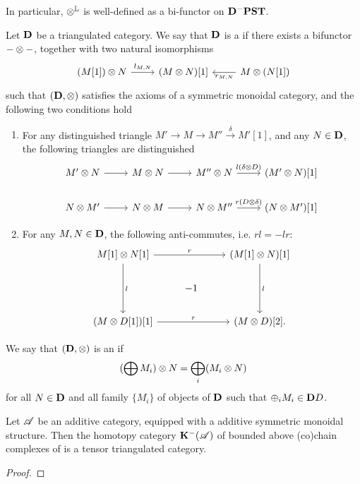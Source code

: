 In particular, $\tL$ is well-defined as a bi-functor on 
$\DCat[D]^-\PST$.

\begin{defn}
Let $\DCat[D]$ be a triangulated category. We say that $\DCat[D]$ 
is a  if there exists a bifunctor
$- \tensor -$, together with two natural isomorphisms 
\[
\begin{tikzcd}
(M[1]) \tensor N \arrow{r}{l_{M, N}}&
(M \tensor N)[1] &
M \tensor (N[1]) \arrow{l}{r_{M, N}}
\end{tikzcd}
\]
such that $(\DCat[D], \tensor)$ satisfies the axioms of a 
symmetric monoidal category, and the following two conditions
hold
\begin{enumerate}
\item For any distinguished triangle $M' \to M \to M'' 
\stackrel{\delta}{\to} M'[1]$, and any $N \in \DCat[D]$,
the following triangles are distinguished
\[
\begin{tikzcd}
M' \tensor N \arrow{r} &
M \tensor N \arrow{r} &
M'' \tensor N \arrow{r}{l(\delta \tensor D)}&
(M' \tensor N)[1] \\
N \tensor M' \arrow{r} &
N \tensor M \arrow{r} &
N \tensor M'' \arrow{r}{r(D \tensor \delta)}&
(N \tensor M')[1]
\end{tikzcd}
\]

\item For any $M, N \in \DCat[D]$, the following anti-commutes,
i.e. $rl = -lr$:
\[
\begin{tikzcd}
M[1] \tensor N[1] \arrow{rr}{r}\arrow{dd}{l} && 
(M[1] \tensor N)[1] \arrow{dd}{l} \\
& -1 \\
(M \tensor D[1])[1] \arrow{rr}{r} &&
(M \tensor D)[2].
\end{tikzcd}
\]
\end{enumerate}

We say that $(\DCat, \tensor)$ is an  if 
\[
(\bigoplus M_i) \tensor N = \bigoplus_i (M_i \tensor N)
\]
for all $N \in \DCat[D]$ and all family $\{M_i\}$ of
objects of $\DCat[D]$ such that $\oplus_i M_i \in \DCat{D}$.
\end{defn}

\begin{lem}\label{lem_tensor_add_cat}
Let $\Cat{A}$ be an additive category, equipped with a additive 
symmetric monoidal structure. Then the homotopy category 
$\DCat[K]^-(\Cat{A})$ of bounded above (co)chain complexes of
is a tensor triangulated category.
\end{lem}
\begin{proof}
\end{proof}

